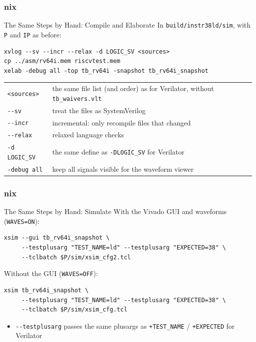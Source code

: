 \documentclass{beamer}
\newcommand{\astitle}{nix}
\newcommand{\assubtitle}{nix}
\newcommand{\cmd}[1]{\texttt{#1}}
\begin{document}
\renewcommand{\assubtitle}{The Same Steps by Hand: Compile and Elaborate}
\begin{frame}[fragile]
\frametitle{\astitle}
\begin{block}{\assubtitle}
  In \cmd{build/instr38ld/sim}, with \cmd{P} and \cmd{IP} as before:
\begin{lstlisting}[style=sh]
xvlog --sv --incr --relax -d LOGIC_SV <sources>
cp ../asm/rv64i.mem riscvtest.mem
xelab -debug all -top tb_rv64i -snapshot tb_rv64i_snapshot
\end{lstlisting}
  \footnotesize
  \begin{tabularx}{\linewidth}{@{}lY@{}}
    \cmd{<sources>}       & the same file list (and order) as for Verilator, without \cmd{tb\_waivers.vlt}\\[2pt]
    \cmd{-{}-sv}          & treat the files as SystemVerilog\\[2pt]
    \cmd{-{}-incr}        & incremental: only recompile files that changed\\[2pt]
    \cmd{-{}-relax}       & relaxed language checks\\[2pt]
    \cmd{-d LOGIC\_SV}    & the same define as \cmd{-DLOGIC\_SV} for Verilator\\[2pt]
    \cmd{-debug all}      & keep all signals visible for the waveform viewer\\
  \end{tabularx}
\end{block}
\end{frame}

\renewcommand{\assubtitle}{The Same Steps by Hand: Simulate}
\begin{frame}[fragile]
\frametitle{\astitle}
\begin{block}{\assubtitle}
  With the Vivado GUI and waveforms (\cmd{WAVES=ON}):
\begin{lstlisting}[style=sh]
xsim --gui tb_rv64i_snapshot \
     --testplusarg "TEST_NAME=ld" --testplusarg "EXPECTED=38" \
     --tclbatch $P/sim/xsim_cfg2.tcl
\end{lstlisting}
  Without the GUI (\cmd{WAVES=OFF}):
\begin{lstlisting}[style=sh]
xsim tb_rv64i_snapshot \
     --testplusarg "TEST_NAME=ld" --testplusarg "EXPECTED=38" \
     --tclbatch $P/sim/xsim_cfg.tcl
\end{lstlisting}
  \begin{itemize}
    \item \cmd{-{}-testplusarg} passes the same plusargs as
      \cmd{+TEST\_NAME} / \cmd{+EXPECTED} for Verilator
  \end{itemize}
\end{block}
\end{frame}
\end{document}
